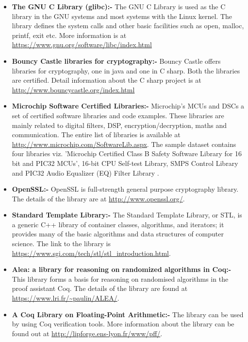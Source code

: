 \documentclass[11pt,letterpaper]{report}
\begin{document}
\begin{itemize}
\item \textbf{The GNU C Library (glibc):- } The GNU C Library is used as the C library in the GNU systems and most systems with the Linux kernel. The library defines the system calls and other basic facilities such as open, malloc, printf, exit etc. More information is at \url{https://www.gnu.org/software/libc/index.html} \cite{Glibc}
\item \textbf{Bouncy Castle libraries for cryptography:- } Bouncy Castle offers libraries for cryptography, one in java and one in C sharp. Both the libraries are certified. Detail information about the C sharp project is at \url{http://www.bouncycastle.org/index.html} \cite{BCastleJava, BSharp}
\item \textbf{Microchip Software Certified Libraries:- } Microchip’s MCUs and DSCs a set of certified software libraries and code examples. These libraries are mainly related to digital filters, DSP, encryption/decryption, maths and communication. The entire list of libraries is available at \url{http://www.microchip.com/SoftwareLib.aspx}. \cite{MCHIP} The sample dataset contains four libraries viz. 'Microchip Certified Class B Safety Software Library for 16 bit and PIC32 MCUs', 16-bit CPU Self-test Library, SMPS Control Library and PIC32 Audio Equalizer (EQ) Filter Library .
\item \textbf{OpenSSL:- } OpenSSL is full-strength general purpose cryptography library. The details of the library are at \url{http://www.openssl.org/}. \cite{SSL}
\item \textbf{Standard Template Library:- } The Standard Template Library, or STL, is a generic C++ library of container classes, algorithms, and iterators; it provides many of the basic algorithms and data structures of computer science. The link to the library is \url{https://www.sgi.com/tech/stl/stl_introduction.html}. \cite{STL}
\item \textbf{Alea: a library for reasoning on randomized algorithms in Coq:- } This library forms a basis for reasoning on randomised algorithms in the proof assistant Coq. The details of the library are found at \url{https://www.lri.fr/~paulin/ALEA/}. \cite{Alea}
\item \textbf{A Coq Library on Floating-Point Arithmetic:- } The library can be used by using Coq verification tools. More information about the library can be found out at \url{http://lipforge.ens-lyon.fr/www/pff/}. \cite{DFC}
\end{itemize}
\end{document}
